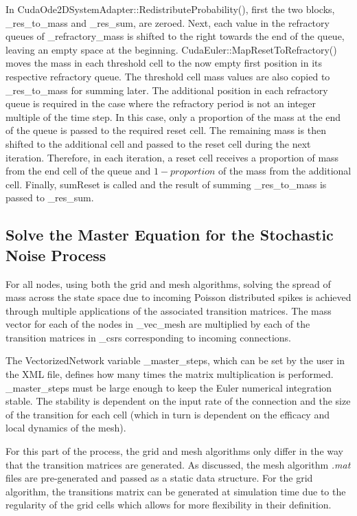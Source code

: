 \documentclass[utf8]{frontiers_suppmat} %
\begin{document}
In CudaOde2DSystemAdapter::RedistributeProbability(), first the two blocks, \_res\_to\_mass and \_res\_sum, are zeroed. Next, each value in the refractory queues of \_refractory\_mass is shifted to the right towards the end of the queue, leaving an empty space at the beginning. CudaEuler::MapResetToRefractory() moves the mass in each threshold cell to the now empty first position in its respective refractory queue. The threshold cell mass values are also copied to \_res\_to\_mass for summing later. The additional position in each refractory queue is required in the case where the refractory period is not an integer multiple of the time step. In this case, only a proportion of the mass at the end of the queue is passed to the required reset cell. The remaining mass is then shifted to the additional cell and passed to the reset cell during the next iteration. Therefore, in each iteration, a reset cell receives a proportion of mass from the end cell of the queue and $1 - proportion$ of the mass from the additional cell. Finally, sumReset is called and the result of summing \_res\_to\_mass is passed to \_res\_sum.\\

\subsection{Solve the Master Equation for the Stochastic Noise Process}

For all nodes, using both the grid and mesh algorithms, solving the spread of mass across the state space due to incoming Poisson distributed spikes is achieved through multiple applications of the associated transition matrices. The mass vector for each of the nodes in \_vec\_mesh are multiplied by each of the transition matrices in \_csrs corresponding to incoming connections.

The VectorizedNetwork variable \_master\_steps, which can be set by the user in the XML file, defines how many times the matrix multiplication is performed. \_master\_steps must be large enough to keep the Euler numerical integration stable. The stability is dependent on the input rate of the connection and the size of the transition for each cell (which in turn is dependent on the efficacy and local dynamics of the mesh). 

For this part of the process, the grid and mesh algorithms only differ in the way that the transition matrices are generated. As discussed, the mesh algorithm \textit{.mat} files are pre-generated and passed as a static data structure. For the grid algorithm, the transitions matrix can be generated at simulation time due to the regularity of the grid cells which allows for more flexibility in their definition.
\end{document}
